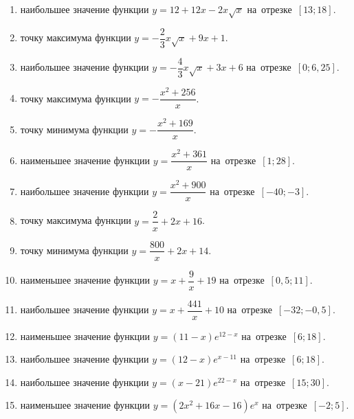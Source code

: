 \documentclass[a4paper,10pt]{article}
\begin{document}
\begin{enumerate}
\item {} наибольшее значение функции $y=12+12x -2x\sqrt{x}$ на~отрезке~$\left[13;18\right]$.

\item {} точку максимума функции $y=-\dfrac{2}{3}x\sqrt{x} +9x+1$.

\item {} наибольшее значение функции $y=-\dfrac{4}{3}x\sqrt{x} +3x+6$ на~отрезке~$\left[0;6,25\right]$.

\item {} точку максимума функции $y=-\dfrac{x^2 +256}{x}$.

\item {} точку минимума функции $y=-\dfrac{x^2 +169}{x}$.

\item {} наименьшее значение функции $y=\dfrac{x^2 +361}{x}$ на~отрезке~$\left[1;28\right]$.

\item {} наибольшее значение функции $y=\dfrac{x^2 +900}{x}$ на~отрезке~$\left[-40;-3\right]$.

\item {} точку максимума функции $y=\dfrac{2}{x} +2x+16$.

\item {} точку минимума функции $y=\dfrac{800}{x} +2x+14$.

\item {} наименьшее значение функции $y=x+\dfrac{9}{x} +19$ на~отрезке~$\left[0,5;11\right]$.

\item {} наибольшее значение функции $y=x+\dfrac{441}{x} +10$ на~отрезке~$\left[-32;-0,5\right]$.

\item {} наименьшее значение функции $y=\left(11-x\right)e^{12-x}$ на~отрезке~$\left[6;18\right]$.

\item {} наибольшее значение функции $y=\left(12-x\right)e^{x-11}$ на~отрезке~$\left[6;18\right]$.

\item {} наибольшее значение функции $y=\left(x-21\right)e^{22-x}$ на~отрезке~$\left[15;30\right]$.

\item {} наименьшее значение функции $y=\left(2x^2 +16x -16\right)e^{x }$ на~отрезке~$\left[-2;5\right]$.


\end{enumerate}
\end{document}

